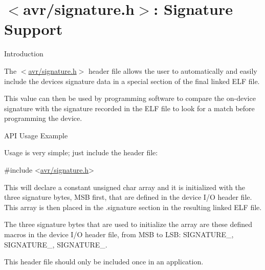 \hypertarget{group__avr__signature}{}\section{$<$avr/signature.h$>$\+: Signature Support}
\label{group__avr__signature}
\begin{DoxyParagraph}{Introduction}

\end{DoxyParagraph}
The $<$\hyperlink{signature_8h}{avr/signature.\+h}$>$ header file allows the user to automatically and easily include the device\textquotesingle{}s signature data in a special section of the final linked E\+LF file.

This value can then be used by programming software to compare the on-\/device signature with the signature recorded in the E\+LF file to look for a match before programming the device.

\begin{DoxyParagraph}{A\+PI Usage Example}

\end{DoxyParagraph}
Usage is very simple; just include the header file\+:


\begin{DoxyCode}
\textcolor{preprocessor}{#include <\hyperlink{signature_8h}{avr/signature.h}>}
\end{DoxyCode}


This will declare a constant unsigned char array and it is initialized with the three signature bytes, M\+SB first, that are defined in the device I/O header file. This array is then placed in the .signature section in the resulting linked E\+LF file.

The three signature bytes that are used to initialize the array are these defined macros in the device I/O header file, from M\+SB to L\+SB\+: S\+I\+G\+N\+A\+T\+U\+R\+E\+\_, S\+I\+G\+N\+A\+T\+U\+R\+E\+\_, S\+I\+G\+N\+A\+T\+U\+R\+E\+\_.

This header file should only be included once in an application. 